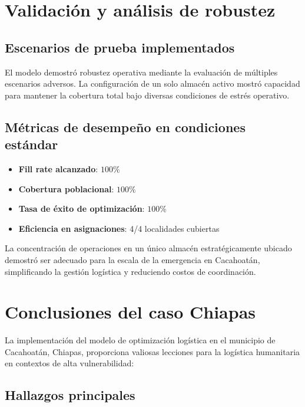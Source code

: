 \documentclass[
  spanish,
  us-letterpaper,
]{scrreprt}
\providecommand{\tightlist}{%
  \setlength{\itemsep}{0pt}\setlength{\parskip}{0pt}}
\numberwithin{equation}{chapter} %
\begin{document}
\section{Validación y análisis de
robustez}\label{validaciuxf3n-y-anuxe1lisis-de-robustez}

\subsection{Escenarios de prueba
implementados}\label{escenarios-de-prueba-implementados}

El modelo demostró robustez operativa mediante la evaluación de
múltiples escenarios adversos. La configuración de un solo almacén
activo mostró capacidad para mantener la cobertura total bajo diversas
condiciones de estrés operativo.

\subsection{Métricas de desempeño en condiciones
estándar}\label{muxe9tricas-de-desempeuxf1o-en-condiciones-estuxe1ndar}

\begin{itemize}
\tightlist
\item
  \textbf{Fill rate alcanzado}: \(100\%\)
\item
  \textbf{Cobertura poblacional}: \(100\%\)
\item
  \textbf{Tasa de éxito de optimización}: \(100\%\)
\item
  \textbf{Eficiencia en asignaciones}: 4/4 localidades cubiertas
\end{itemize}

La concentración de operaciones en un único almacén estratégicamente
ubicado demostró ser adecuado para la escala de la emergencia en
Cacahoatán, simplificando la gestión logística y reduciendo costos de
coordinación.

\section{Conclusiones del caso
Chiapas}\label{conclusiones-del-caso-chiapas}

La implementación del modelo de optimización logística en el municipio
de Cacahoatán, Chiapas, proporciona valiosas lecciones para la logística
humanitaria en contextos de alta vulnerabilidad:

\subsection{Hallazgos principales}\label{hallazgos-principales}
\end{document}
